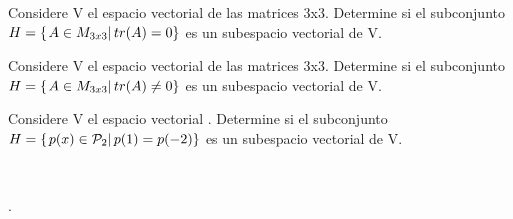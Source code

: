 \begin{enumerate}[1.]
\begin{prob}
Considere V el espacio vectorial de las matrices 3x3. Determine si el subconjunto $H=\left\{ \left. A \in M_{3x3}\right| tr(A)=0 \right\} $ es un subespacio vectorial de V.
\end{prob}
\begin{prob}
Considere V el espacio vectorial de las matrices 3x3. Determine si el subconjunto $H=\left\{ \left. A \in M_{3x3}\right| tr(A)\neq0 \right\} $ es un subespacio vectorial de V.
\end{prob}
\begin{prob}
Considere V el espacio vectorial \pdos. Determine si el subconjunto $H=\left\{ \left. p(x)\in \mathcal{P}_2\right| p(1)=p(-2) \right\} $ es un subespacio vectorial de V.
\end{prob}

~\\

\end{enumerate}
.
